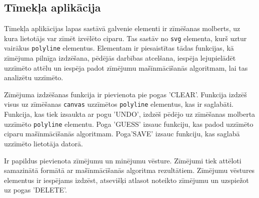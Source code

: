\subsection{Tīmekļa aplikācija}
Tīmekļa aplikācijas lapas sastāvā galvenie elementi ir zīmēšanas molberts, uz kura lietotājs var zīmēt izvēlēto ciparu. Tas sastāv no \texttt{svg} elementa, kurš uztur vairākus \texttt{polyline} elementus. Elementam ir piesaistītas tādas funkcijas, kā zīmējuma pilnīga izdzēšana, pēdējās darbības atcelšana, iespēja lejupielādēt uzzīmēto attēlu un iespēja padot zīmējumu mašīnmācīšanās algoritmam, lai tas analizētu uzzīmēto.\par Zīmējuma izdzēšanas funkcija ir pievienota pie pogas 'CLEAR'. Funkcija izdzēš visus uz zīmēšanas \texttt{canvas} uzzīmētos \texttt{polyline} elementus, kas ir saglabāti. Funkcija, kas tiek izsaukta ar pogu 'UNDO', izdzēš pēdējo uz zīmēšanas molberta uzzīmēto \texttt{polyline} elementu. Poga 'GUESS' izsauc funkciju, kas padod uzzīmēto ciparu mašīnmācīšanās algoritmam. Poga'SAVE' izsauc funkciju, kas saglabā uzzīmēto lietotāja datorā.
\par Ir papildus pievienota zīmējumu un minējumu vēsture. Zīmējumi tiek attēloti samazinātā formātā ar mašīnmācīšanās algoritma rezultātiem. Zīmējumu vēstures elementus ir iespējams izdzēst, atsevišķi atlasot noteikto zīmējumu un uzspiežot uz pogas 'DELETE'.
